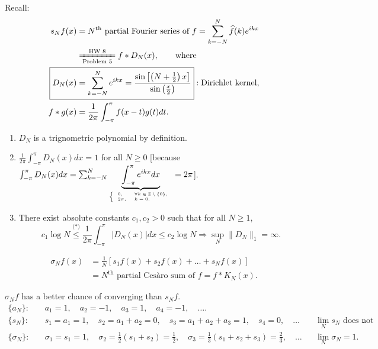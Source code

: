 \documentclass[letterpaper, reqno,11pt]{article}
\newcommand{\ZZ}{\mathbb{Z}}
\begin{document}
Recall:
\begin{align*}
  s_N f(x) &= \text{$N^\text{th}$ partial Fourier series of $f$} = \sum_{k = -N}^N \widehat f(k) e^{ikx} \\
  &\xlongequal[\text{Problem 5}]{\text{HW 8}} f * D_N(x), \qquad \text{where} \\
  \Aboxed{D_N(x) &= \sum_{k = -N}^N e^{ikx} = \frac{\sin\left[\left(N + \frac{1}{2}\right) x\right]}{\sin\left(\frac{x}{2}\right)}} : \text{Dirichlet kernel}, \\
  f * g(x) &= \frac{1}{2\pi} \int_{-\pi}^\pi f(x - t) g(t) dt.
\end{align*}

\begin{thm}
  \normalfont
  \begin{enumerate}
  \item $D_N$ is a trignometric polynomial by definition.
  \item $\frac{1}{2\pi} \int_{-\pi}^\pi D_N(x) dx = 1$ for all $N \geq 0$ [because $\int_{-\pi}^\pi D_N(x) dx = \sum_{k = -N}^N \underbrace{\int_{-\pi}^\pi e^{ikx} dx}_{\tiny \left\{\begin{array}{ll} 0, & \forall k \in \ZZ \setminus \{ 0 \}, \\ 2\pi, & k = 0. \end{array}\right.} = 2\pi$].
  \item There exist absolute constants $c_1, c_2 > 0$ such that for all $N \geq 1$,
    \[ \boxed{c_1 \log N \overset{\text{(*)}}{\leq} \frac{1}{2\pi} \int_{-\pi}^\pi |D_N(x)| dx \leq c_2 \log N} \Rightarrow \sup_N \lVert D_N \rVert_1 = \infty. \]
  \end{enumerate}
\end{thm}

\begin{align*}
  \sigma_N f(x) &= \frac{1}{N} [s_1 f(x) + s_2 f(x) + \ldots + s_N f(x)] \\
  &= \text{$N^\text{th}$ partial Ces\`aro sum of $f$} = f * K_N(x).
\end{align*}

 $\sigma_N f$ has a better chance of converging than $s_N f$.
\begin{align*}
  \{ a_N \}: & \quad a_1 = 1, \quad a_2 = -1, \quad a_3 = 1, \quad a_4 = -1, \quad \ldots. \\
  \{ s_N \}: & \quad s_1 = a_1 = 1, \quad s_2 = a_1 + a_2 = 0, \quad s_3 = a_1 + a_2 + a_3 = 1, \quad s_4 = 0, \quad \ldots && \text{$\lim_N s_N$ does not exist}. \\
  \{ \sigma_N \}: & \quad \sigma_1 = s_1 = 1, \quad \sigma_2 = \frac{1}{2}(s_1 + s_2) = \frac{1}{2}, \quad \sigma_3 = \frac{1}{3}(s_1 + s_2 + s_3) = \frac{2}{3}, \quad \ldots && \lim_N \sigma_N = 1.
\end{align*}
\end{document}
